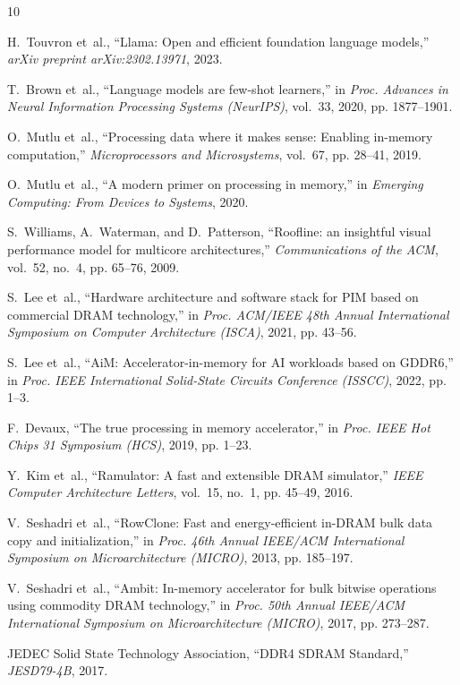\documentclass[conference]{IEEEtran}
\begin{document}
\begin{thebibliography}{10}

H.~Touvron et~al., ``Llama: Open and efficient foundation language models,'' \emph{arXiv preprint arXiv:2302.13971}, 2023.

T.~Brown et~al., ``Language models are few-shot learners,'' in \emph{Proc. Advances in Neural Information Processing Systems (NeurIPS)}, vol.~33, 2020, pp. 1877--1901.

O.~Mutlu et~al., ``Processing data where it makes sense: Enabling in-memory computation,'' \emph{Microprocessors and Microsystems}, vol.~67, pp. 28--41, 2019.

O.~Mutlu et~al., ``A modern primer on processing in memory,'' in \emph{Emerging Computing: From Devices to Systems}, 2020.

S.~Williams, A.~Waterman, and D.~Patterson, ``Roofline: an insightful visual performance model for multicore architectures,'' \emph{Communications of the ACM}, vol.~52, no.~4, pp. 65--76, 2009.

S.~Lee et~al., ``Hardware architecture and software stack for PIM based on commercial DRAM technology,'' in \emph{Proc. ACM/IEEE 48th Annual International Symposium on Computer Architecture (ISCA)}, 2021, pp. 43--56.

S.~Lee et~al., ``AiM: Accelerator-in-memory for AI workloads based on GDDR6,'' in \emph{Proc. IEEE International Solid-State Circuits Conference (ISSCC)}, 2022, pp. 1--3.

F.~Devaux, ``The true processing in memory accelerator,'' in \emph{Proc. IEEE Hot Chips 31 Symposium (HCS)}, 2019, pp. 1--23.

Y.~Kim et~al., ``Ramulator: A fast and extensible DRAM simulator,'' \emph{IEEE Computer Architecture Letters}, vol.~15, no.~1, pp. 45--49, 2016.

V.~Seshadri et~al., ``RowClone: Fast and energy-efficient in-DRAM bulk data copy and initialization,'' in \emph{Proc. 46th Annual IEEE/ACM International Symposium on Microarchitecture (MICRO)}, 2013, pp. 185--197.

V.~Seshadri et~al., ``Ambit: In-memory accelerator for bulk bitwise operations using commodity DRAM technology,'' in \emph{Proc. 50th Annual IEEE/ACM International Symposium on Microarchitecture (MICRO)}, 2017, pp. 273--287.

JEDEC Solid State Technology Association, ``DDR4 SDRAM Standard,'' \emph{JESD79-4B}, 2017.

\end{thebibliography}
\end{document}
